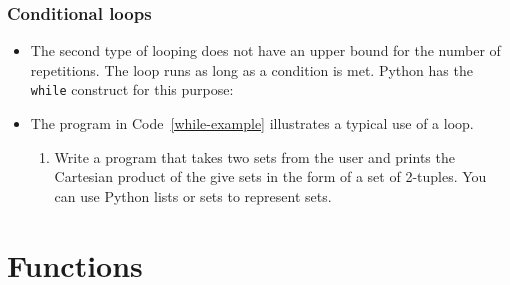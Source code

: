 \documentclass[a4paper]{article}
\begin{document}
\subsubsection{Conditional loops}

\begin{itemize}

\item The second type of looping does not have an upper bound for the number of
repetitions. The loop runs as long as a condition is met. Python has the
\Verb+while+ construct for this purpose:

\item The program in Code~\ref{while-example} illustrates a typical use of a
 loop. 


\begin{uexercise}\label{excontainers}
\begin{enumerate}
\item \label{excartesian}
Write a program that takes two sets from the user and prints the Cartesian
product of the give sets in the form of a set of 2-tuples. You can use Python lists or
sets to represent sets.
\end{enumerate}
\end{uexercise}

\end{itemize}


\section{Functions}
\label{sec:functions}
\end{document}
